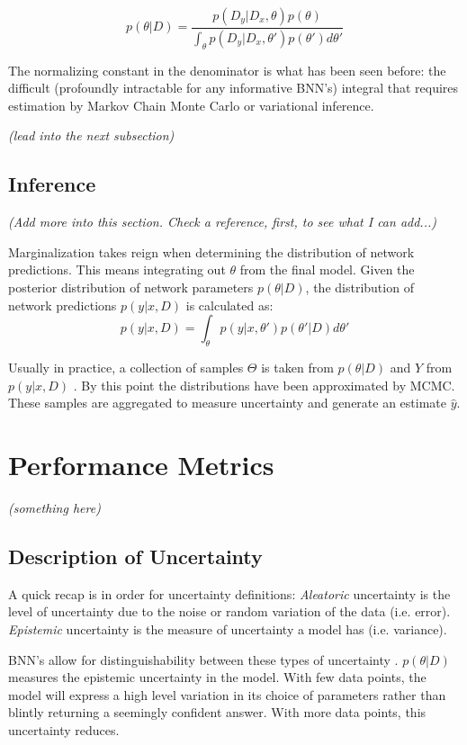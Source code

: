 $$
p(\theta|D) = \frac{p(D_{y}|D_{x},\theta)p(\theta)}{\int_\theta p(D_{y}|D_{x},\theta')p(\theta')d\theta'}
$$

The normalizing constant in the denominator is what has been seen before: the difficult (profoundly intractable for any informative BNN's) integral that requires estimation by Markov Chain Monte Carlo or variational inference.

\textit{(lead into the next subsection)}

\subsection{Inference}

\textit{(Add more into this section.  Check a reference, first, to see what I can add...)}

Marginalization takes reign when determining the distribution of network predictions.  This means integrating out $\theta$ from the final model.  Given the posterior distribution of network parameters $p(\theta|D)$, the distribution of network predictions $p(y|x,D)$ is calculated as:
$$
p(y|x,D) = \int_\theta p(y|x,\theta')p(\theta'|D)d\theta'
$$

Usually in practice, a collection of samples $\Theta$ is taken from $p(\theta|D)$ and $Y$ from $p(y|x,D)$ \cite{Jospin}. By this point the distributions have been approximated by MCMC. These samples are aggregated to measure uncertainty and generate an estimate $\hat{y}$.



\section{Performance Metrics}

\textit{(something here)}

\subsection{Description of Uncertainty}

A quick recap is in order for uncertainty definitions: \textit{Aleatoric} uncertainty is the level of uncertainty due to the noise or random variation of the data (i.e. error).  \textit{Epistemic} uncertainty is the measure of uncertainty a model has (i.e. variance).

BNN's allow for distinguishability between these types of uncertainty \cite{Jospin}.  $p(\theta|D)$ measures the epistemic uncertainty in the model.  With few data points, the model will express a high level variation in its choice of parameters rather than blintly returning a seemingly confident answer.  With more data points, this uncertainty reduces.


